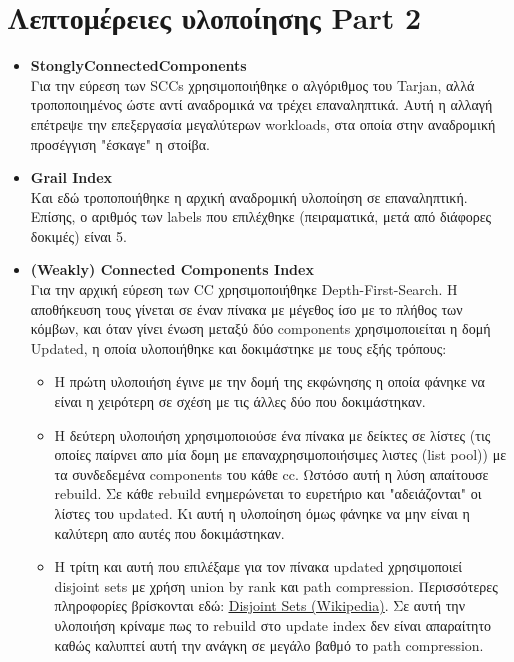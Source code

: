 \documentclass[11pt]{article}
\begin{document}
\section{Λεπτομέρειες υλοποίησης Part 2}
\begin{itemize}
\item \textbf{StonglyConnectedComponents}\\
Για την εύρεση των SCCs χρησιμοποιήθηκε ο αλγόριθμος του Tarjan, αλλά τροποποιημένος ώστε αντί αναδρομικά να τρέχει επαναληπτικά. Αυτή η αλλαγή επέτρεψε την επεξεργασία μεγαλύτερων workloads, στα οποία στην αναδρομική προσέγγιση "έσκαγε" η στοίβα.
\item \textbf{Grail Index}\\
Και εδώ τροποποιήθηκε η αρχική αναδρομική υλοποίηση σε επαναληπτική. Επίσης, ο αριθμός των labels που επιλέχθηκε (πειραματικά, μετά από διάφορες δοκιμές) είναι 5.
\item \textbf{(Weakly) Connected Components Index}\\
Για την αρχική εύρεση των CC χρησιμοποιήθηκε Depth-First-Search. Η αποθήκευση τους γίνεται σε έναν πίνακα με μέγεθος ίσο με το πλήθος των κόμβων, και όταν γίνει ένωση μεταξύ δύο components χρησιμοποιείται η δομή Updated, η οποία υλοποιήθηκε και δοκιμάστηκε με τους εξής τρόπους:
\begin{itemize}
\item H πρώτη υλοποιήση έγινε με την δομή της εκφώνησης η οποία φάνηκε να είναι η χειρότερη σε σχέση με τις άλλες δύο που δοκιμάστηκαν.
\item Η δεύτερη υλοποιήση χρησιμοποιούσε ένα πίνακα με δείκτες σε λίστες (τις οποίες παίρνει απο μία δομη με επαναχρησιμοποιήσιμες λιστες (list pool)) με τα συνδεδεμένα components του κάθε cc. Ωστόσο αυτή η λύση απαίτουσε rebuild. Σε κάθε rebuild ενημερώνεται το ευρετήριο και "αδειάζονται" οι λίστες του updated. Κι αυτή η υλοποίηση όμως φάνηκε να μην είναι η καλύτερη απο αυτές που δοκιμάστηκαν.
\item Η τρίτη και αυτή που επιλέξαμε για τον πίνακα updated χρησιμοποιεί disjoint sets με χρήση union by rank και path compression. Περισσότερες πληροφορίες βρίσκονται εδώ: {\color{blue}\underline{\href{https://en.wikipedia.org/wiki/Disjoint-set\_data\_structure\#Union\_by\_rank}{Disjoint Sets (Wikipedia)}}}. Σε αυτή την υλοποιήση κρίναμε πως το rebuild στο update index δεν είναι απαραίτητο καθώς καλυπτεί αυτή την ανάγκη σε μεγάλο βαθμό το path compression.
\end{itemize}
\end{itemize}
\end{document}
